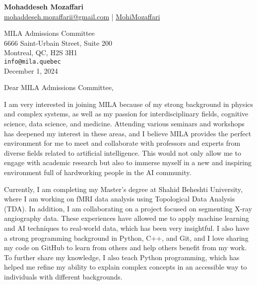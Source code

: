 \documentclass[letterpaper,11pt]{letter}
\begin{document}
\begin{center}
    \textbf{\Huge Mohaddeseh Mozaffari} \\
    \small{\href{mailto:mohaddeseh.mozaffarii@gmail.com}{ mohaddeseh.mozaffarii@gmail.com} | 	\href{https://www.linkedin.com/in/MohiMozaffari/}{ MohiMozaffari}}
\end{center}

\vspace{1em}

\begin{flushleft}
    MILA Admissions Committee\\
    6666 Saint-Urbain Street, Suite 200\\
    Montreal, QC, H2S 3H1\\
    \texttt{info@mila.quebec} \\
    December 1, 2024
\end{flushleft}

\vspace{1em}

\begin{flushleft}
    Dear MILA Admissions Committee,
\end{flushleft}

\vspace{1em}
I am very interested in joining MILA because of my strong background in physics and complex systems, as well as my passion for interdisciplinary fields, cognitive science, data science, and medicine. Attending various seminars and workshops has deepened my interest in these areas, and I believe MILA provides the perfect environment for me to meet and collaborate with professors and experts from diverse fields related to artificial intelligence. This would not only allow me to engage with academic research but also to immerse myself in a new and inspiring environment full of hardworking people in the AI community.

Currently, I am completing my Master's degree at Shahid Beheshti University, where I am working on fMRI data analysis using Topological Data Analysis (TDA). In addition, I am collaborating on a project focused on segmenting X-ray angiography data. These experiences have allowed me to apply machine learning and AI techniques to real-world data, which has been very insightful. I also have a strong programming background in Python, C++, and Git, and I love sharing my code on GitHub to learn from others and help others benefit from my work. To further share my knowledge, I also teach Python programming, which has helped me refine my ability to explain complex concepts in an accessible way to individuals with different backgrounds.
\end{document}

